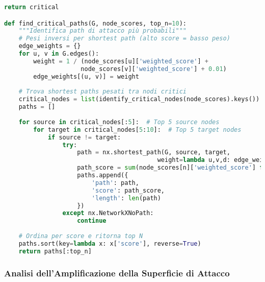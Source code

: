 \begin{lstlisting}[language=Python, caption=Calcolo ASSA per Infrastrutture Distribuite]
    return critical

def find_critical_paths(G, node_scores, top_n=10):
    """Identifica path di attacco più probabili"""
    # Pesi inversi per shortest path (alto score = basso peso)
    edge_weights = {}
    for u, v in G.edges():
        weight = 1 / (node_scores[u]['weighted_score'] + 
                     node_scores[v]['weighted_score'] + 0.01)
        edge_weights[(u, v)] = weight
    
    # Trova shortest paths pesati tra nodi critici
    critical_nodes = list(identify_critical_nodes(node_scores).keys())
    paths = []
    
    for source in critical_nodes[:5]:  # Top 5 source nodes
        for target in critical_nodes[5:10]:  # Top 5 target nodes
            if source != target:
                try:
                    path = nx.shortest_path(G, source, target, 
                                          weight=lambda u,v,d: edge_weights.get((u,v), 1))
                    path_score = sum(node_scores[n]['weighted_score'] for n in path)
                    paths.append({
                        'path': path,
                        'score': path_score,
                        'length': len(path)
                    })
                except nx.NetworkXNoPath:
                    continue
    
    # Ordina per score e ritorna top N
    paths.sort(key=lambda x: x['score'], reverse=True)
    return paths[:top_n]
\end{lstlisting}

\subsubsection{Analisi dell'Amplificazione della Superficie di Attacco}

